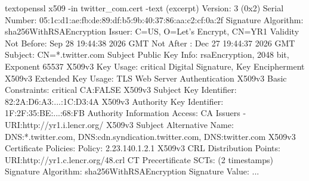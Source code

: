             \begin{codeblock}[]{text}{openssl x509 -in twitter\_com.cert -text (excerpt)}
                Version: 3 (0x2)
                Serial Number: 05:1c:d1:ae:fb:de:89:df:b5:9b:40:37:86:aa:c2:cf:0a:2f
                Signature Algorithm: sha256WithRSAEncryption
                Issuer: C=US, O=Let's Encrypt, CN=YR1
                Validity
                    Not Before: Sep 28 19:44:38 2026 GMT
                    Not After : Dec 27 19:44:37 2026 GMT
                Subject: CN=*.twitter.com
                Subject Public Key Info: rsaEncryption, 2048 bit, Exponent 65537
                X509v3 Key Usage: critical  Digital Signature, Key Encipherment
                X509v3 Extended Key Usage:  TLS Web Server Authentication
                X509v3 Basic Constraints: critical  CA:FALSE
                X509v3 Subject Key Identifier:   82:2A:D6:A3:...:1C:D3:4A
                X509v3 Authority Key Identifier: 1F:2F:35:BE:...:68:FB
                Authority Information Access: CA Issuers - URI:http://yr1.i.lencr.org/
                X509v3 Subject Alternative Name:
                    DNS:*.twitter.com, DNS:cdn.syndication.twitter.com, DNS:twitter.com
                X509v3 Certificate Policies: Policy: 2.23.140.1.2.1
                X509v3 CRL Distribution Points: URI:http://yr1.c.lencr.org/48.crl
                CT Precertificate SCTs: (2 timestamps)
                Signature Algorithm: sha256WithRSAEncryption  Signature Value: ...
            \end{codeblock}

